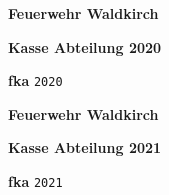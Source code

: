 \documentclass[12pt]{scrartcl}
\begin{document}
\begin{center}
  \large \textbf{Feuerwehr Waldkirch}


  \vspace{\fill}
   \begin{turn}{90}
      \Huge{ 
	\textbf{Kasse Abteilung 2020}
      }
   \end{turn}
  \vspace{\fill}


  \textbf{fka}
  \texttt{2020}
\end{center}

\newpage

\begin{center}
  \large \textbf{Feuerwehr Waldkirch}


  \vspace{\fill}
   \begin{turn}{90}
      \Huge{ 
	\textbf{Kasse Abteilung 2021}
      }
   \end{turn}
  \vspace{\fill}


  \textbf{fka}
  \texttt{2021}

\end{center}

\end{document}
